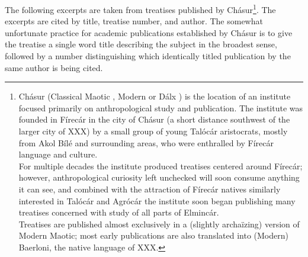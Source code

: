 \documentclass[a4paper]{article}
\begin{document}
The following excerpts are taken from treatises published by Chásur\footnote{Chásur (Classical Maotic , Modern  or Dálx ) is the location of an institute focused primarily on anthropological study and publication. The institute was founded in Fírecár in the city of Chásur (a short distance southwest of the larger city of XXX) by a small group of young Talócár aristocrats, mostly from Akol Bílé and surrounding areas, who were enthralled by Fírecár language and culture. \\ For multiple decades the institute produced treatises centered around Fírecár; however, anthropological curiosity left unchecked will soon consume anything it can see, and combined with the attraction of Fírecár natives similarly interested in Talócár and Agrócár the institute soon began publishing many treatises concerned with study of all parts of Elmincár. \\ Treatises are published almost exclusively in a (slightly archaïzing) version of Modern Maotic; most early publications are also translated into (Modern) Baerloni, the native language of XXX.}. The excerpts are cited by title, treatise number, and author. The somewhat unfortunate practice for academic publications established by Chásur is to give the treatise a single word title describing the subject in the broadest sense, followed by a number distinguishing which identically titled publication by the same author is being cited.
\end{document}
